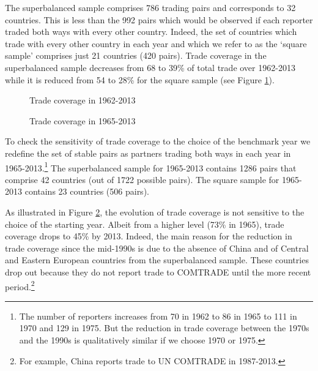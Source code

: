 \documentclass[12pt,twoside,a4paper,notitlepage]{article}
\begin{document}
The superbalanced sample comprises 786 trading pairs and corresponds to 32 countries.
This is less than the 992 pairs which would be observed if each reporter traded both ways with every other country.
Indeed, the set of countries which trade with every other country in each year and which we refer to as the `square sample' comprises just 21 countries (420 pairs).
Trade coverage in the superbalanced sample decreases from 68 to 39\% of total trade over 1962-2013 while it is reduced from 54 to 28\% for the square sample (see Figure \ref{fig:coverage}).


\begin{figure}[h]
\begin{center}
\setlength{\fboxrule}{1pt} %
\setlength{\fboxsep}{.1in} %
\end{center}
\caption{Trade coverage in 1962-2013 \label{fig:coverage}}
\end{figure}
\begin{figure}[h!]
\begin{center}
\setlength{\fboxrule}{1pt} %
\setlength{\fboxsep}{.1in} %
\end{center}
\caption{Trade coverage in 1965-2013 \label{fig:superbal6513}}
\end{figure}

To check the sensitivity of trade coverage to the choice of the benchmark year we redefine the set of stable pairs as partners trading both ways in each year in 1965-2013.\footnote{The number of reporters increases from 70 in 1962 to 86 in 1965 to 111 in 1970 and 129 in 1975.
But the reduction in trade coverage between the 1970s and the 1990s is qualitatively similar if we choose 1970 or 1975.} The superbalanced sample for 1965-2013 contains 1286 pairs that comprise 42 countries (out of 1722 possible pairs).
The square sample for 1965-2013 contains 23 countries (506 pairs).

As illustrated in Figure \ref{fig:superbal6513}, the evolution of trade coverage is not sensitive to the choice of the starting year.
Albeit from a higher level (73\% in 1965), trade coverage drops to 45\% by 2013.
Indeed, the main reason for the reduction in trade coverage since the mid-1990s is due to the absence of China and of Central and Eastern European countries from the superbalanced sample.
These countries drop out because they do not report trade to COMTRADE until the more recent period.\footnote{For example, China reports trade to UN COMTRADE in 1987-2013.} 
\end{document}
